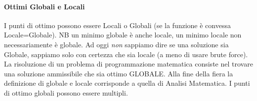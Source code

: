 \documentclass[12pt, a4paper, openany]{book}
\begin{document}
\paragraph*{Ottimi Globali e Locali}
I punti di ottimo possono essere Locali o Globali (se la funzione è convessa Locale=Globale). NB un minimo globale è anche locale, un minimo locale non necessariamente è globale.
Ad oggi \emph{non} sappiamo dire se una soluzione sia Globale, sappiamo solo con certezza che sia locale (a meno di usare brute force).
\\La risoluzione di un problema di programmazione matematica consiste nel trovare una soluzione ammissibile che sia ottimo GLOBALE.
Alla fine della fiera la definizione di globale e locale corrisponde a quella di Analisi Matematica.
I punti di ottimo globali possono essere multipli.
\end{document}
